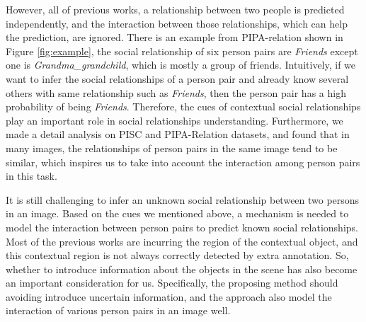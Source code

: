 \documentclass{article}
\begin{document}
However, all of previous works, a relationship between two people is predicted independently, and the interaction between those relationships, which can help the prediction, are ignored.
There is an example from PIPA-relation \cite{DBLP:conf/cvpr/SunSF17} shown in Figure \ref{fig:example}, the social relationship of six person pairs are {\it Friends} except one is {\it Grandma\_grandchild}, which is mostly a group of friends. Intuitively, if we want to infer the social relationships of a person pair and already know several others with same relationship such as {\it Friends}, then the person pair has a high probability of being {\it Friends}. Therefore, the cues of contextual social relationships play an important role in social relationships understanding.
Furthermore, we made a detail analysis on PISC and PIPA-Relation datasets, and found that
in many images, the relationships of person pairs in the same image tend to be similar, which inspires us to take into account the interaction among person pairs in this task.



It is still challenging to infer an unknown social relationship between two persons in an image.
Based on the cues we mentioned above, a mechanism is needed to model the interaction between person pairs to predict known social relationships. Most of the previous works are incurring the region of the contextual object, and this contextual region is not always correctly detected by extra annotation. So, whether to introduce information about the objects in the scene has also become an important consideration for us. Specifically, the proposing method should avoiding introduce uncertain information, and the approach also model the interaction of various person pairs in an image well.
\end{document}
